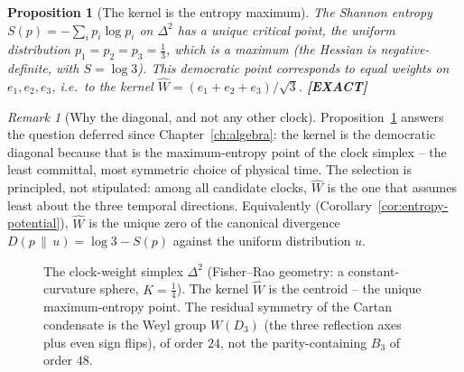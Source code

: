 \documentclass[11pt,oneside]{book}
\newcommand{\Wh}{\hat{W}}                         %
\newcommand{\Zt}{\mathbb{Z}_2}
\newcommand{\status}[1]{{\sffamily\bfseries\color{statuscol}[#1]}}
\theoremstyle{plain}
\newtheorem{proposition}[theorem]{Proposition}
\theoremstyle{definition}
\theoremstyle{remark}
\newtheorem{remark}[theorem]{Remark}
\begin{document}
\begin{proposition}[The kernel is the entropy maximum]
\label{prop:maxent}
The Shannon entropy $S(p)=-\sum_i p_i\log p_i$ on $\Delta^2$ has a unique critical
point, the uniform distribution $p_1=p_2=p_3=\tfrac13$, which is a maximum (the
Hessian is negative-definite, with $S=\log3$). This democratic point corresponds to
equal weights on $e_1,e_2,e_3$, i.e.\ to the kernel
$\Wh=(e_1+e_2+e_3)/\sqrt3$. \status{EXACT}
\end{proposition}

\begin{remark}[Why the diagonal, and not any other clock]
Proposition~\ref{prop:maxent} answers the question deferred since
Chapter~\ref{ch:algebra}: the kernel is the democratic diagonal because that is the
maximum-entropy point of the clock simplex -- the least committal, most symmetric
choice of physical time. The selection is principled, not stipulated: among all
candidate clocks, $\Wh$ is the one that assumes least about the three temporal
directions. Equivalently (Corollary~\ref{cor:entropy-potential}), $\Wh$ is the unique
zero of the canonical divergence $D(p\,\|\,u)=\log3-S(p)$ against the uniform
distribution $u$.
\end{remark}

\begin{figure}[t]
\centering
{}
\caption{The clock-weight simplex $\Delta^2$ (Fisher--Rao geometry: a
constant-curvature sphere, $K=\tfrac14$). The kernel $\Wh$ is the centroid -- the
unique maximum-entropy point. The residual symmetry of the Cartan condensate is the
Weyl group $W(D_3)$ (the three reflection axes plus even sign flips), of order
$24$, not the parity-containing $B_3$ of order $48$.}
\label{fig:simplex}
\end{figure}
\end{document}
